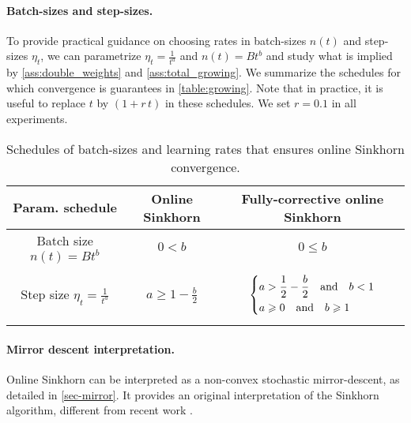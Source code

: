 \if{}
\paragraph{Batch-sizes and step-sizes.}

To provide practical guidance on choosing rates in batch-sizes $n(t)$ and
step-sizes $\eta_t$, we can parametrize $\eta_t = \frac{1}{t^a}$ and $n(t) = B
t^b$ and study what is implied by \autoref{ass:double_weights} and
\autoref{ass:total_growing}. We summarize the schedules for which convergence is
guarantees in \autoref{table:growing}. Note that in practice, it is useful to
replace $t$ by $(1 + r\, t)$ in these schedules. We set $r=0.1$ in all
experiments.
\begin{table}[t]
    \centering
    \caption{Schedules of batch-sizes and learning rates that ensures online Sinkhorn convergence.}

    \begin{tabular}{ccc}
        \toprule
        Param. schedule &Online Sinkhorn & Fully-corrective online Sinkhorn \\
        \midrule
        Batch size $\displaystyle n(t) = B t^b$ & $0 < b $ & $0 \leq b$ \\
        Step size $\displaystyle \eta_t = \frac{1}{t^a}$ &$\displaystyle a \geq 1 - \frac{b}{2}$ & 
        \parbox{5cm}{
        \begin{equation}
            \left\{
                \begin{aligned}
            a &> \frac{1}{2} - \frac{b}{2} \quad \text{and} \quad b <1 \\
            a &\geqslant 0 \quad \text{and} \quad b \geqslant 1
                \end{aligned}
                \right.
        \end{equation}}\\
        \bottomrule
    \end{tabular}
    \label{table:growing}
\end{table}

\paragraph{Mirror descent interpretation.} Online Sinkhorn can be interpreted as a non-convex stochastic mirror-descent, as detailed in \autoref{sec-mirror}. It provides an original interpretation of the Sinkhorn algorithm, different from recent work \citep{leger2019sinkhorn,mishchenko2019sinkhorn}.
\fi

